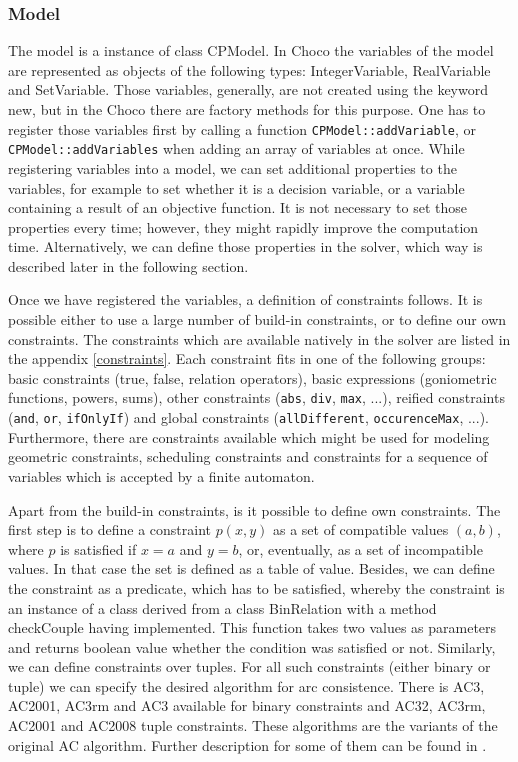 \subsubsection{Model}
The model is a instance of class CPModel. In Choco the variables of the model are represented
as objects of the following types: IntegerVariable, RealVariable and SetVariable. Those 
variables, generally, are not created using the keyword new, but in the Choco there are
factory methods for this purpose. One has to register those variables first by calling
a function \texttt{CPModel::addVariable}, or \texttt{CPModel::addVariables} when adding an array of variables at once.
While registering variables into a model, we can set additional properties to the variables, 
for example to set whether it is a decision variable, or a variable containing a result
of an objective function. It is not necessary to set those properties every time; however,
they might rapidly improve the computation time. Alternatively, we can define those properties
in the solver, which way is described later in the following section.

Once we have registered the variables, a definition of constraints follows. It is possible
either to use a large number of build-in constraints, or to define our own constraints.
The constraints which are available natively in the solver are listed in the appendix \ref{constraints}.
Each constraint fits in one of the following groups: basic constraints (true, false, relation operators),
basic expressions (goniometric functions, powers, sums), other constraints (\texttt{abs}, \texttt{div}, \texttt{max}, ...),
reified constraints (\texttt{and}, \texttt{or}, \texttt{ifOnlyIf}) and global constraints (\texttt{allDifferent}, 
\texttt{occurenceMax}, ...). Furthermore, there are constraints available which might be used for modeling geometric constraints,
scheduling constraints and constraints for a sequence of variables which is accepted by a finite automaton.

Apart from the build-in constraints, is it possible to define own constraints. The first step is to define 
a constraint $p(x,y)$ as a set of compatible values $(a,b)$, where $p$ is satisfied
if $x=a$ and $y=b$, or, eventually, as a set of incompatible values. In that case the
set is defined as a table of value. Besides, we can define the constraint as a predicate, which has to
be satisfied, whereby the constraint is an instance of a class derived from a class BinRelation
with a method checkCouple having implemented. This function takes two values as parameters and 
returns boolean value whether the condition was satisfied or not. Similarly, we can define 
constraints over tuples. For all such constraints (either binary or tuple) we can specify the 
desired algorithm for arc consistence. There is AC3, AC2001, AC3rm and AC3 available for binary constraints and
 AC32, AC3rm, AC2001 and AC2008 tuple constraints. These algorithms are the variants of
 the original AC algorithm. Further description for some of them can be found in \cite{bartak:ogcp}.
 
